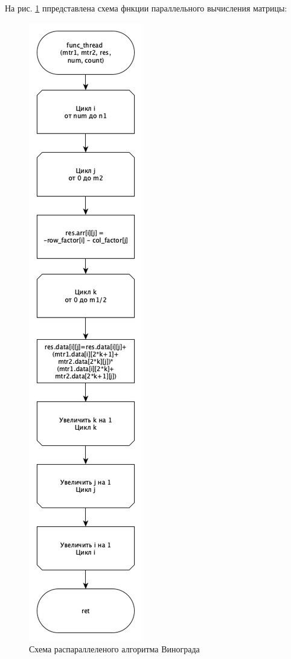 \documentclass[12pt]{report}
\begin{document}
На рис. \ref{fig:def} ппредставлена схема фнкции параллельного вычисления матрицы:
	\begin{figure}[h]
        	\begin{center}
        		\includegraphics[scale=0.32]{parallel_func}
        		\caption{Схема распараллеленого алгоритма Винограда}
        		\label{fig:def}
        	\end{center}
        \end{figure}
\end{document}
